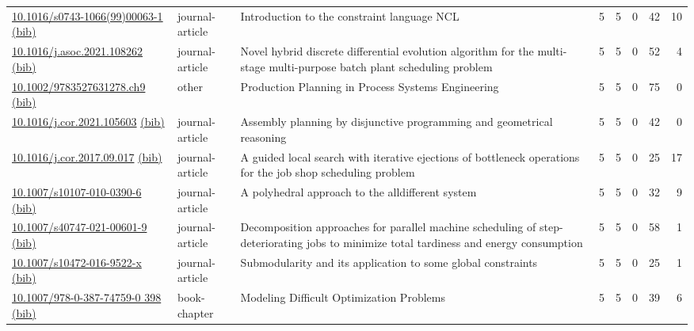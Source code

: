 {\begin{longtable}{p{5cm}lp{11cm}rrrrr}
\href{http://dx.doi.org/10.1016/s0743-1066(99)00063-1}{10.1016/s0743-1066(99)00063-1} \href{https://www.doi2bib.org/bib/10.1016/s0743-1066(99)00063-1}{(bib)} & journal-article & Introduction to the constraint language NCL & 5 & 5 & 0 & 42 & 10 \\
\href{http://dx.doi.org/10.1016/j.asoc.2021.108262}{10.1016/j.asoc.2021.108262} \href{https://www.doi2bib.org/bib/10.1016/j.asoc.2021.108262}{(bib)} & journal-article & Novel hybrid discrete differential evolution algorithm for the multi-stage multi-purpose batch plant scheduling problem & 5 & 5 & 0 & 52 & 4 \\
\href{http://dx.doi.org/10.1002/9783527631278.ch9}{10.1002/9783527631278.ch9} \href{https://www.doi2bib.org/bib/10.1002/9783527631278.ch9}{(bib)} & other & Production Planning in Process Systems Engineering & 5 & 5 & 0 & 75 & 0 \\
\href{http://dx.doi.org/10.1016/j.cor.2021.105603}{10.1016/j.cor.2021.105603} \href{https://www.doi2bib.org/bib/10.1016/j.cor.2021.105603}{(bib)} & journal-article & Assembly planning by disjunctive programming and geometrical reasoning & 5 & 5 & 0 & 42 & 0 \\
\href{http://dx.doi.org/10.1016/j.cor.2017.09.017}{10.1016/j.cor.2017.09.017} \href{https://www.doi2bib.org/bib/10.1016/j.cor.2017.09.017}{(bib)} & journal-article & A guided local search with iterative ejections of bottleneck operations for the job shop scheduling problem & 5 & 5 & 0 & 25 & 17 \\
\href{http://dx.doi.org/10.1007/s10107-010-0390-6}{10.1007/s10107-010-0390-6} \href{https://www.doi2bib.org/bib/10.1007/s10107-010-0390-6}{(bib)} & journal-article & A polyhedral approach to the alldifferent system & 5 & 5 & 0 & 32 & 9 \\
\href{http://dx.doi.org/10.1007/s40747-021-00601-9}{10.1007/s40747-021-00601-9} \href{https://www.doi2bib.org/bib/10.1007/s40747-021-00601-9}{(bib)} & journal-article & Decomposition approaches for parallel machine scheduling of step-deteriorating jobs to minimize total tardiness and energy consumption & 5 & 5 & 0 & 58 & 1 \\
\href{http://dx.doi.org/10.1007/s10472-016-9522-x}{10.1007/s10472-016-9522-x} \href{https://www.doi2bib.org/bib/10.1007/s10472-016-9522-x}{(bib)} & journal-article & Submodularity and its application to some global constraints & 5 & 5 & 0 & 25 & 1 \\
\href{http://dx.doi.org/10.1007/978-0-387-74759-0_398}{10.1007/978-0-387-74759-0 398} \href{https://www.doi2bib.org/bib/10.1007/978-0-387-74759-0_398}{(bib)} & book-chapter & Modeling Difficult Optimization Problems & 5 & 5 & 0 & 39 & 6 \\

\end{longtable}}
